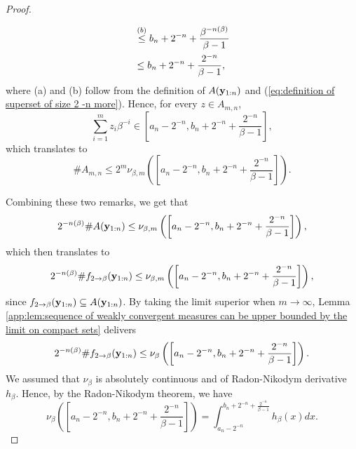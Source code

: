 \begin{proof}
\begin{enumerate}[label=(\alph*)]
\begin{align}
            & \overset{(b)}{\leq} b_n + 2^{-n} + \frac{\beta^{-n(\beta)}}{\beta-1}\\
            & \leq b_n + 2^{-n} + \frac{2^{-n}}{\beta-1},
        \end{align}
        where (a) and (b) follow from the definition of $A({\bf y}_{1:n})$ and (\ref{eq:definition of superset of size 2 -n more}). Hence, for every $z \in A_{m,n}$,
        \begin{equation}
            \sum_{i=1}^{m} z_i \beta^{-i} \in \left[a_n - 2^{-n}, b_n + 2^{-n} + \frac{2^{-n}}{\beta-1}\right],
        \end{equation}
        which translates to
        \begin{equation}
            \#A_{m,n} \leq 2^m\nu_{\beta,m}\left(\left[a_n - 2^{-n}, b_n + 2^{-n} + \frac{2^{-n}}{\beta-1}\right]\right).
        \end{equation}
    \end{enumerate}
    Combining these two remarks, we get that 
    \begin{equation}
        2^{-n(\beta)} \# A({\bf y}_{1:n}) \leq \nu_{\beta,m}\left(\left[a_n - 2^{-n}, b_n + 2^{-n} + \frac{2^{-n}}{\beta-1}\right]\right),
    \end{equation}
    which then translates to 
    \begin{equation}
        2^{-n(\beta)} \# f_{2 \to \beta}({\bf y}_{1:n}) \leq \nu_{\beta,m}\left(\left[a_n - 2^{-n}, b_n + 2^{-n} + \frac{2^{-n}}{\beta-1}\right]\right),
    \end{equation}
    since $f_{2 \to \beta}({\bf y}_{1:n}) \subseteq A({\bf y}_{1:n})$.
    By taking the limit superior when $m \to \infty$, Lemma \ref{app:lem:sequence of weakly convergent measures can be upper bounded by the limit on compact sets} delivers
    \begin{equation}\label{eq:0:proof:thm:asymptotic behavior of card f x when the Bernoulli convolution is absolutely continuous}
        2^{-n(\beta)} \# f_{2 \to \beta}({\bf y}_{1:n}) \leq \nu_{\beta}\left(\left[a_n - 2^{-n}, b_n + 2^{-n} + \frac{2^{-n}}{\beta-1}\right]\right).
    \end{equation}
    We assumed that $\nu_\beta$ is absolutely continuous and of Radon-Nikodym derivative $h_\beta$. Hence, by the Radon-Nikodym theorem, we have
    \begin{equation}\label{eq:1:proof:thm:asymptotic behavior of card f x when the Bernoulli convolution is absolutely continuous}
        \nu_\beta\left(\left[a_n - 2^{-n}, b_n + 2^{-n} + \frac{2^{-n}}{\beta-1}\right]\right) = \int_{a_n - 2^{-n}}^{b_n + 2^{-n} + \frac{2^{-n}}{\beta-1}} h_\beta(x) dx.

\end{equation}
\end{proof}
